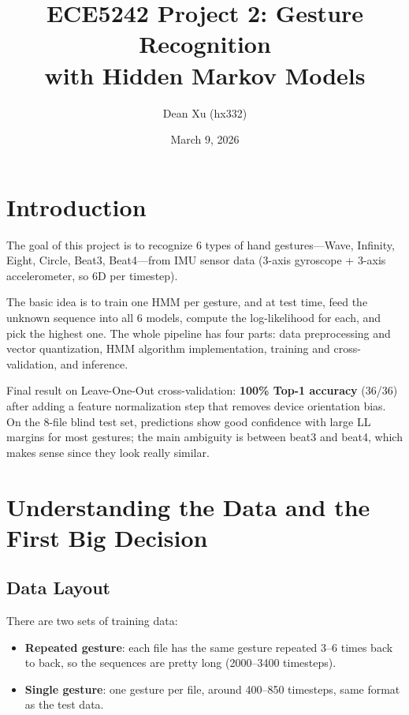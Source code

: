 \documentclass[11pt]{article}
\title{ECE5242 Project 2: Gesture Recognition \\with Hidden Markov Models}
\author{Dean Xu (hx332)}
\date{March 9, 2026}
\begin{document}
\maketitle

\section{Introduction}

The goal of this project is to recognize 6 types of hand gestures---Wave, Infinity, Eight, Circle, Beat3, Beat4---from IMU sensor data (3-axis gyroscope + 3-axis accelerometer, so 6D per timestep).

The basic idea is to train one HMM per gesture, and at test time, feed the unknown sequence into all 6 models, compute the log-likelihood for each, and pick the highest one. The whole pipeline has four parts: data preprocessing and vector quantization, HMM algorithm implementation, training and cross-validation, and inference.

Final result on Leave-One-Out cross-validation: \textbf{100\% Top-1 accuracy} (36/36) after adding a feature normalization step that removes device orientation bias. On the 8-file blind test set, predictions show good confidence with large LL margins for most gestures; the main ambiguity is between beat3 and beat4, which makes sense since they look really similar.


\section{Understanding the Data and the First Big Decision}

\subsection{Data Layout}

There are two sets of training data:

\begin{itemize}[nosep]
    \item \textbf{Repeated gesture}: each file has the same gesture repeated 3--6 times back to back, so the sequences are pretty long (2000--3400 timesteps).
    \item \textbf{Single gesture}: one gesture per file, around 400--850 timesteps, same format as the test data.
\end{itemize}
\end{document}
